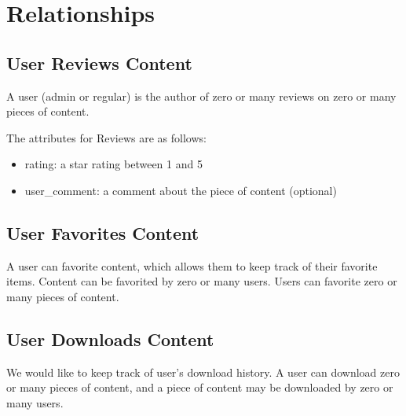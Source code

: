 \documentclass[letter, 12pt, titlepage]{article}
\begin{document}
	\section{Relationships}
		\subsection{User Reviews Content}
			A user (admin or regular) is the author of zero or many reviews on zero or many pieces of content. 

			The attributes for Reviews are as follows:
			\begin{itemize}
				\item rating: a star rating between 1 and 5
				\item user\_comment: a comment about the piece of content (optional)
			\end{itemize}
		\subsection{User Favorites Content}
			A user can favorite content, which allows them to keep track of their favorite items. Content can be favorited by zero or many users. Users can favorite zero or many pieces of content.	
		\subsection{User Downloads Content}
			We would like to keep track of user's download history. A user can download zero or many pieces of content, and a piece of content may be downloaded by zero or many users.
\end{document}
